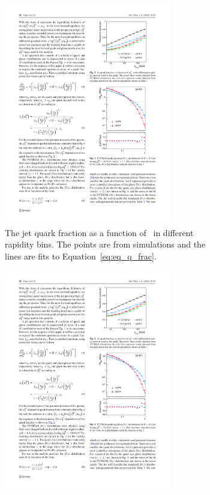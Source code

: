 \begin{figure}
\begin{subfigure}{.45\textwidth}
  \centering
\includegraphics[width=0.8\textwidth]{figures/jetMeasurements/jetQuarkFraction}
\caption{The jet quark fraction as a function of \ptjet\ in different rapidity bins. The points are from  simulations and the lines are fits to Equation~\ref{eq:eq_q_frac}.}
\label{fig:raa_centDep}
\end{subfigure} \qquad
\begin{subfigure}{.45\textwidth}
  \centering
\includegraphics[width=0.8\textwidth]{figures/jetMeasurements/gluon_fragmentation}

\end{subfigure}
\end{figure}
